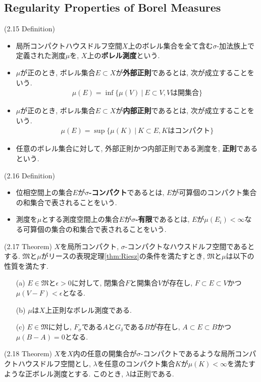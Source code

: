 \documentclass[a4paper]{jsarticle}
\begin{document}
\subsection{Regularity Properties of Borel Measures}
\begin{defi}{(2.15 Definition)}{}
    \begin{itemize}
        \item 局所コンパクトハウスドルフ空間$X$上のボレル集合を全て含む$\sigma$-加法族上で定義された測度$\mu$を, $X$上の{\bf ボレル測度}という.
        \item $\mu$が正のとき, ボレル集合$E\subset X$が{\bf 外部正則}であるとは, 次が成立することをいう.
        \begin{align*}
            \mu(E) = \inf \{ \mu(V) \ | \ E\subset V, Vは開集合 \}
        \end{align*}
        \item $\mu$が正のとき, ボレル集合$E\subset X$が{\bf 内部正則}であるとは, 次が成立することをいう.
        \begin{align*}
            \mu(E) = \sup \{ \mu(K) \ | \ K\subset E, K はコンパクト \}
        \end{align*}
        \item 任意のボレル集合に対して, 外部正則かつ内部正則である測度を, {\bf 正則}であるという.
    \end{itemize}
\end{defi}
\begin{defi}{(2.16 Definition)}{}
    \begin{itemize}
        \item 位相空間上の集合$E$が{\bf $\sigma$-コンパクト}であるとは, $E$が可算個のコンパクト集合の和集合で表されることをいう.
        \item 測度を$\mu$とする測度空間上の集合$E$が{\bf $\sigma$-有限}であるとは, $E$が$\mu(E_i)<\infty$なる可算個の集合の和集合で表されることをいう.
    \end{itemize}
\end{defi}
\begin{thm}{(2.17 Theorem)}{}
    $X$を局所コンパクト, $\sigma$-コンパクトなハウスドルフ空間であるとする. $\mathfrak{M}$と$\mu$がリースの表現定理\ref{thm:Riesz}の条件を満たすとき, $\mathfrak{M}$と$\mu$は以下の性質を満たす.
    \begin{enumerate}
        \item[(a)] $E\in \mathfrak{M}$と$\epsilon>0$に対して, 閉集合$F$と開集合$V$が存在し, $F\subset E\subset V$かつ$\mu(V-F)<\epsilon$となる.
        \item[(b)] $\mu$は$X$上正則なボレル測度である.
        \item[(c)] $E\in \mathfrak{M}$に対し, $F_\sigma$である$A$と$G_\delta$である$B$が存在し, $A\subset E\subset B$かつ$\mu(B-A)=0$となる.
    \end{enumerate}
\end{thm}
\begin{thm}{(2.18 Theorem)}{}
    $X$を$X$内の任意の開集合が$\sigma$-コンパクトであるような局所コンパクトハウスドルフ空間とし, $\lambda$を任意のコンパクト集合$K$が$\mu(K)<\infty$を満たすような正ボレル測度とする. このとき, $\lambda$は正則である.
\end{thm}
\end{document}
